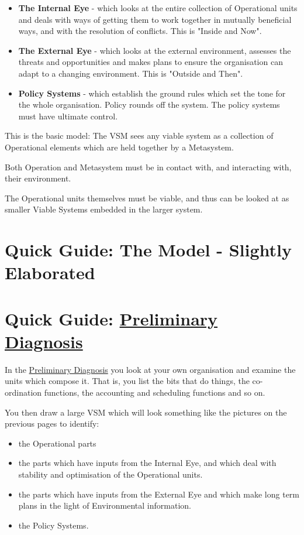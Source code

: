 \begin{itemize}
  \item \textbf{The Internal Eye} - which looks at the entire collection of Operational units and deals with ways of getting them to work together in mutually beneficial ways, and with the resolution of conflicts. This is "Inside and Now".

  \item \textbf{The External Eye} - which looks at the external environment, assesses the threats and opportunities and makes plans to ensure the organisation can adapt to a changing environment. This is "Outside and Then".

  \item \textbf{Policy Systems} - which establish the ground rules which set the tone for the whole organisation. Policy rounds off the system. The policy systems must have ultimate control.

\end{itemize}

This is the basic model: The VSM sees any viable system as a collection of Operational elements which are held together by a Metasystem.

Both Operation and Metasystem must be in contact with, and interacting with, their environment.

The Operational units themselves must be viable, and thus can be looked at as smaller Viable Systems embedded in the larger system.

\section*{Quick Guide: The Model - Slightly Elaborated}

\section*{Quick Guide: \href{https://vsmg.lrc.org.uk/3pd_5sys.html}{Preliminary Diagnosis}}
In the \href{https://vsmg.lrc.org.uk/3pd_5sys.html}{Preliminary Diagnosis} you look at your own organisation and examine the units which compose it. That is, you list the bits that do things, the co-ordination functions, the accounting and scheduling functions and so on.

You then draw a large VSM which will look something like the pictures on the previous pages to identify:

\begin{itemize}
  \item the Operational parts

  \item the parts which have inputs from the Internal Eye, and which deal with stability and optimisation of the Operational units.

  \item the parts which have inputs from the External Eye and which make long term plans in the light of Environmental information.

  \item the Policy Systems.

\end{itemize}

